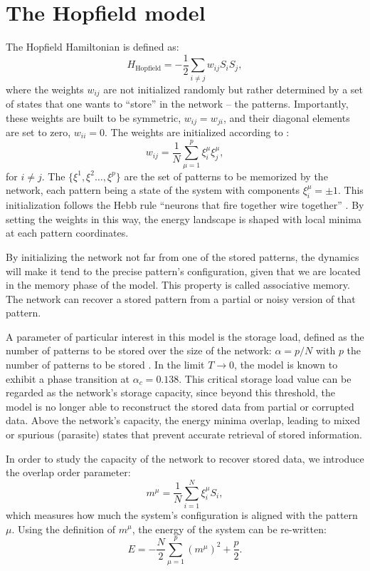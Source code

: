 \section{The Hopfield model}

\label{subsec:hopfield_model}
The Hopfield Hamiltonian is defined as:
\begin{equation}
  H_\text{Hopfield}=-\frac{1}{2}\sum_{i \neq j}w_{ij}S_iS_j,
  \label{eq:Hopfield}
\end{equation}
where the weights $w_{ij}$ are not initialized randomly but rather determined by a set of states that one wants to ``store'' in the network -- the patterns. Importantly, these weights are built to be symmetric, $w_{ij}=w_{ji}$, and their diagonal elements are set to zero, $w_{ii}=0$. The weights are initialized according to :
\begin{equation}
  w_{ij}=\frac{1}{N}\sum_{\mu=1}^{p} \xi_i^\mu \xi_j^\mu,
\end{equation}
for $i \neq j$. The $\{\xi^1, \xi^2 \ldots, \xi^p\}$ are the set of patterns to be memorized by the network, each pattern being a state of the system with components $\xi_i^\mu = \pm 1$. This initialization follows the Hebb rule ``neurons that fire together wire together'' \cite{Hebb1949}. By setting the weights in this way, the energy landscape is shaped with local minima at each pattern coordinates.

By initializing the network not far from one of the stored patterns, the dynamics will make it tend to the precise pattern's configuration, given that we are located in the memory phase of the model. This property is called associative memory. The network can recover a stored pattern from a partial or noisy version of that pattern.

A parameter of particular interest in this model is the storage load, defined as the number of patterns to be stored over the size of the network: $\alpha = p /N$ with $p$ the number of patterns to be stored \cite{Amit1985,AMIT1987,Amit1989,Sompolinsky1988}. In the limit $T\to0$, the model is known to exhibit a phase transition at $\alpha_c= 0.138$. This critical storage load value can be regarded as the network’s storage capacity, since beyond this threshold, the model is no longer able to reconstruct the stored data from partial or corrupted data. Above the network's capacity, the energy minima overlap, leading to mixed or spurious (parasite) states that prevent accurate retrieval of stored information.

In order to study the capacity of the network to recover stored data, we introduce the overlap order parameter:
\begin{equation}
    m^\mu = \frac{1}{N}\sum_{i=1}^N \xi_i^\mu S_i,
\end{equation}
which measures how much the system's configuration is aligned with the pattern $\mu$.
Using the definition of $m^\mu$, the energy of the system can be re-written:
\begin{equation}
  E=-\frac{N}{2}\sum_{\mu=1}^{p} (m^\mu)^2 + \frac{p}{2}.
\end{equation}

